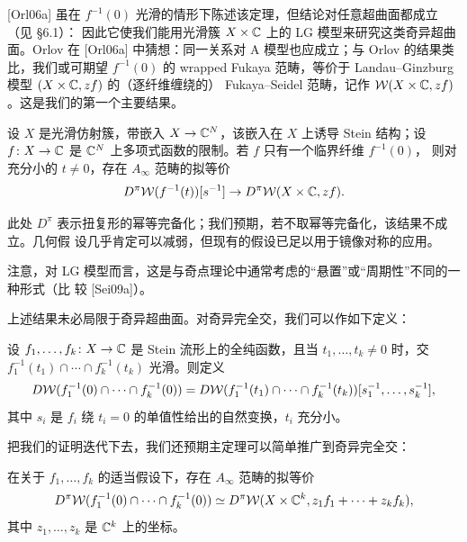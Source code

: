 [Orl06a] 虽在 $f^{-1}(0)$ 光滑的情形下陈述该定理，但结论对任意超曲面都成立（见 §6.1）：
因此它使我们能用光滑簇 $X\times\mathbb{C}$ 上的 LG 模型来研究这类奇异超曲面。Orlov 在 [Orl06a]
中猜想：同一关系对 A 模型也应成立；与 Orlov 的结果类比，我们或可期望 $f^{-1}(0)$ 的
wrapped Fukaya 范畴，等价于 Landau--Ginzburg 模型 $(X\times\mathbb{C},zf)$ 的（逐纤维缠绕的）
Fukaya--Seidel 范畴，记作 $\mathcal{W}(X\times\mathbb{C},zf)$。这是我们的第一个主要结果。


\begin{theorem}\label{thm:knorrer}
设 $X$ 是光滑仿射簇，带嵌入 $X\to\mathbb{C}^N$，该嵌入在 $X$ 上诱导 Stein 结构；设
$f\colon X\to\mathbb{C}$ 是 $\mathbb{C}^N$ 上多项式函数的限制。若 $f$ 只有一个临界纤维 $f^{-1}(0)$，
则对充分小的 $t\neq0$，存在 $A_\infty$ 范畴的拟等价
\[
D^\pi\mathcal{W}(f^{-1}(t))[s^{-1}]\to D^\pi\mathcal{W}(X\times\mathbb{C},zf).
\]
\end{theorem}

此处 $D^\pi$ 表示扭复形的幂等完备化；我们预期，若不取幂等完备化，该结果不成立。几何假
设几乎肯定可以减弱，但现有的假设已足以用于镜像对称的应用。

注意，对 LG 模型而言，这是与奇点理论中通常考虑的“悬置”或“周期性”不同的一种形式（比
较 [Sei09a]）。


上述结果未必局限于奇异超曲面。对奇异完全交，我们可以作如下定义：

\begin{definition}\label{def:sing-ci}
设 $f_1,\dots,f_k\colon X\to\mathbb{C}$ 是 Stein 流形上的全纯函数，且当
$t_1,\dots,t_k\neq0$ 时，交 $f_1^{-1}(t_1)\cap\cdots\cap f_k^{-1}(t_k)$ 光滑。则定义
\[
D\mathcal{W}(f_1^{-1}(0)\cap\cdots\cap f_k^{-1}(0))
=D\mathcal{W}(f_1^{-1}(t_1)\cap\cdots\cap f_k^{-1}(t_k))[s_1^{-1},\dots,s_k^{-1}],
\]
其中 $s_i$ 是 $f_i$ 绕 $t_i=0$ 的单值性给出的自然变换，$t_i$ 充分小。
\end{definition}

把我们的证明迭代下去，我们还预期主定理可以简单推广到奇异完全交：

\begin{conjecture}\label{conj:sing-ci}
在关于 $f_1,\dots,f_k$ 的适当假设下，存在 $A_\infty$ 范畴的拟等价
\[
D^\pi\mathcal{W}(f_1^{-1}(0)\cap\cdots\cap f_k^{-1}(0))
\simeq D^\pi\mathcal{W}(X\times\mathbb{C}^k,z_1f_1+\cdots+z_kf_k),
\]
其中 $z_1,\dots,z_k$ 是 $\mathbb{C}^k$ 上的坐标。
\end{conjecture}


